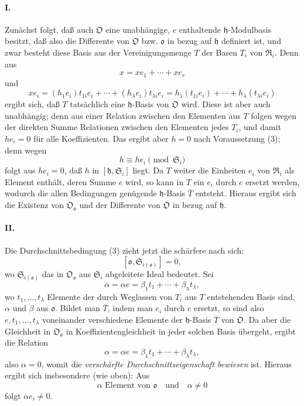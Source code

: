 \paragraph{I.}
Zunächst folgt, daß auch $\mathfrak O$ eine unabhängige, $e$ enthaltende $\mathfrak h$-Modulbasis besitzt, daß also die Differente von $\mathfrak O$ bzw. $\mathfrak o$ in bezug auf $\mathfrak h$ definiert ist, und zwar besteht diese Basis aus der Vereinigungsmenge $T$ der Basen $T_i$ von $\mathfrak R_i$. Denn aus
\[
x=xe_1+\cdots+xe_r
\]
und
\[
xe_i=(h_1e_i)t_{1i}e_i+\cdots+(h_\lambda e_i)t_{\lambda i}e_i
=h_1(t_{1i}e_i)+\cdots+h_\lambda(t_{\lambda i}e_i)
\]
ergibt sich, daß $T$ tatsächlich eine $\mathfrak h$-Basis von $\mathfrak O$ wird. Diese ist aber auch unabhängig; denn aus einer Relation zwischen den Elementen aus $T$ folgen wegen der direkten Summe Relationen zwischen den Elementen jedes $T_i$, und damit $h e_i=0$ für alle Koeffizienten. Das ergibt aber $h=0$ nach Voraussetzung (3); denn wegen
\[
h\equiv h e_i\pmod{\mathfrak S_i}
\]
folgt aus $h e_i=0$, daß $h$ in $[\mathfrak h,\mathfrak S_i]$ liegt. Da $T$ weiter die Einheiten $e_i$ von $\mathfrak R_i$ als Element enthält, deren Summe $e$ wird, so kann in $T$ ein $e_i$ durch $e$ ersetzt werden, wodurch die allen Bedingungen genügende $\mathfrak h$-Basis $\overline T$ entsteht. Hieraus ergibt sich die Existenz von $\mathfrak O_{\mathfrak o}$ und der Differente von $\mathfrak O$ in bezug auf $\mathfrak h$.

\paragraph{II.}
Die Durchschnittsbedingung (3) zieht jetzt die schärfere nach sich:
\[
[\mathfrak o,\mathfrak S_{i(\mathfrak o)}]=0,
\]
wo $\mathfrak S_{i(\mathfrak o)}$ das in $\mathfrak O_{\mathfrak o}$ aus $\mathfrak S_i$ abgeleitete Ideal bedeutet. Sei
\[
\alpha=\alpha e=\beta_1t_1+\cdots+\beta_\lambda t_\lambda,
\]
wo $t_1,\ldots,t_\lambda$ Elemente der durch Weglassen von $T_i$ aus $T$ entstehenden Basis sind, $\alpha$ und $\beta$ aus $\mathfrak o$. Bildet man $\overline T$, indem man $e_i$ durch $e$ ersetzt, so sind also $e,t_1,\ldots,t_\lambda$ voneinander verschiedene Elemente der $\mathfrak h$-Basis $\overline T$ von $\mathfrak O$. Da aber die Gleichheit in $\mathfrak O_{\mathfrak o}$ in Koeffizientengleichheit in jeder solchen Basis übergeht, ergibt die Relation
\[
\alpha=\alpha e=\beta_1t_1+\cdots+\beta_\lambda t_\lambda,
\]
also $\alpha=0$, womit die \emph{verschärfte Durchschnittseigenschaft bewiesen} ist. Hieraus ergibt sich insbesondere (wie oben): Aus
\[
\alpha\text{ Element von }\mathfrak o\quad\text{und}\quad\alpha\ne0
\]
folgt $\alpha e_i\ne0$.

